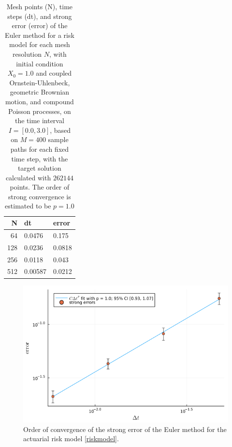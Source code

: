 \documentclass[reqno,12pt]{amsart}
\theoremstyle{plain} %
\theoremstyle{definition} %
\begin{document}
\begin{table}
    \begin{tabular}[htb]{|r|l|l|}
        \hline N & dt & error\\
        \hline \hline
        64 & 0.0476 & 0.175 \\
        128 & 0.0236 & 0.0818 \\
        256 & 0.0118 & 0.043 \\
        512 & 0.00587 & 0.0212 \\
        \hline
    \end{tabular}
    \bigskip

    \caption{Mesh points (N), time steps (dt), and strong error (error) of the Euler method for a risk model for each mesh resolution $N$, with initial condition $X_0 = 1.0$ and coupled Ornstein-Uhlenbeck, geometric Brownian motion, and compound Poisson processes, on the time interval $I = [0.0, 3.0]$, based on $M = 400$ sample paths for each fixed time step, with the target solution calculated with $262144$ points. The order of strong convergence is estimated to be $p = 1.0$}
    \label{tableriskmodel}
\end{table}

\begin{figure}[htb]
    \includegraphics[scale=0.4]{img/convergence_riskmodel.png}
    \caption{Order of convergence of the strong error of the Euler method for the actuarial risk model \eqref{riskmodel}.}
    \label{figriskmodel}
\end{figure}
\end{document}

